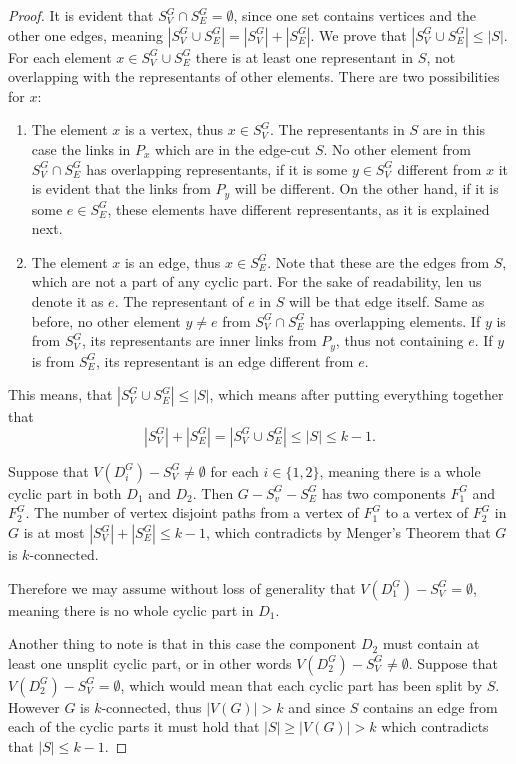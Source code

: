 \begin{proof}
	It is evident that $S_V^G\cap S_E^G=\emptyset$, since one set contains vertices and the other one edges, meaning $|S_V^G\cup S_E^G|=|S_V^G|+|S_E^G|$. We prove that $|S_V^G\cup S_E^G|\leq |S|$. For each element $x\in S_V^G\cup S_E^G$ there is at least one representant in $S$, not overlapping with the representants of other elements. There are two possibilities for $x$:
	\begin{enumerate}
		\item The element $x$ is a vertex, thus $x\in S_V^G$. The representants in $S$ are in this case the links in $P_x$ which are in the edge-cut $S$. No other element from $S_V^G\cap S_E^G$ has overlapping representants, if it is some $y\in S_V^G$ different from $x$ it is evident that the links from $P_y$ will be different. On the other hand, if it is some $e\in S_E^G$, these elements have different representants, as it is explained next.
		\item The element $x$ is an edge, thus $x\in S_E^G$. Note that these are the edges from $S$, which are not a part of any cyclic part. For the sake of readability, len us denote it as $e$. The representant of $e$ in $S$ will be that edge itself. Same as before, no other element $y\neq e$ from $S_V^G\cap S_E^G$ has overlapping elements. If $y$ is from $S_V^G$, its representants are inner links from $P_y$, thus not containing $e$. If $y$ is from $S_E^G$, its representant is an edge different from $e$.
	\end{enumerate} 
	
	This means, that $|S_V^G\cup S_E^G|\leq |S|$, which means after putting everything together that $$|S_V^G|+|S_E^G|=|S_V^G\cup S_E^G|\leq |S|\leq k-1.$$

	Suppose that $V(D_i^G)-S_V^G\neq\emptyset$ for each $i\in \{1,2\}$, meaning there is a whole cyclic part in both $D_1$ and $D_2$. Then $G-S_v^G-S_E^G$ has two components $F_1^G$ and $F_2^G$. The number of vertex disjoint paths from a vertex of $F_1^G$ to a vertex of $F_2^G$ in $G$ is at most $|S_V^G|+|S_E^G|\leq k-1$, which contradicts by Menger's Theorem that $G$ is $k$-connected.
	
	Therefore we may assume without loss of generality that $V(D_1^G)-S_V^G=\emptyset$, meaning there is no whole cyclic part in $D_1$.
	
	Another thing to note is that in this case the component $D_2$ must contain at least one unsplit cyclic part, or in other words $V(D_2^G)-S_V^G\neq\emptyset$. Suppose that $V(D_2^G)-S_V^G=\emptyset$, which would mean that each cyclic part has been split by $S$. However $G$ is $k$-connected, thus $|V(G)|>k$ and since $S$ contains an edge from each of the cyclic parts it must hold that $|S|\geq |V(G)|>k$ which contradicts that $|S|\leq k-1$.
	

\end{proof}
